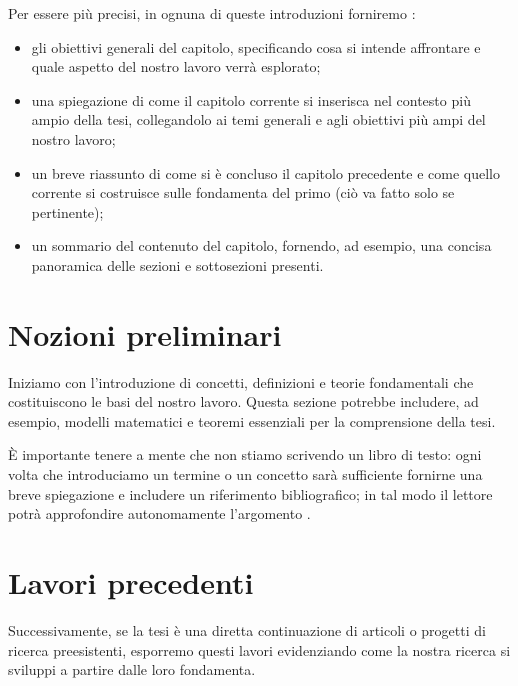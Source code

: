 \medskip

Per essere più precisi, in ognuna di queste introduzioni forniremo \cite{unibz2022thesis}:
\begin{itemize}

\item gli obiettivi generali del capitolo, specificando cosa si intende affrontare e quale aspetto del nostro lavoro verrà esplorato;

\item una spiegazione di come il capitolo corrente si inserisca nel contesto più ampio della tesi, collegandolo ai temi generali e agli obiettivi più ampi del nostro lavoro;

\item un breve riassunto di come si è concluso il capitolo precedente e come quello corrente si costruisce sulle fondamenta del primo (ciò va fatto solo se pertinente);

\item un sommario del contenuto del capitolo, fornendo, ad esempio, una concisa panoramica delle sezioni e sottosezioni presenti.

\end{itemize}

\section{Nozioni preliminari}

Iniziamo con l'introduzione di concetti, definizioni e teorie fondamentali che costituiscono le basi del nostro lavoro. Questa sezione potrebbe includere, ad esempio, modelli matematici e teoremi essenziali per la comprensione della tesi.

\medskip

È importante tenere a mente che non stiamo scrivendo un libro di testo: ogni volta che introduciamo un termine o un concetto sarà sufficiente fornirne una breve spiegazione e includere un riferimento bibliografico; in tal modo il lettore potrà approfondire autonomamente l'argomento \cite{tuni2019guide}.

\section{Lavori precedenti}

Successivamente, se la tesi è una diretta continuazione di articoli o progetti di ricerca preesistenti, esporremo questi lavori evidenziando come la nostra ricerca si sviluppi a partire dalle loro fondamenta.

